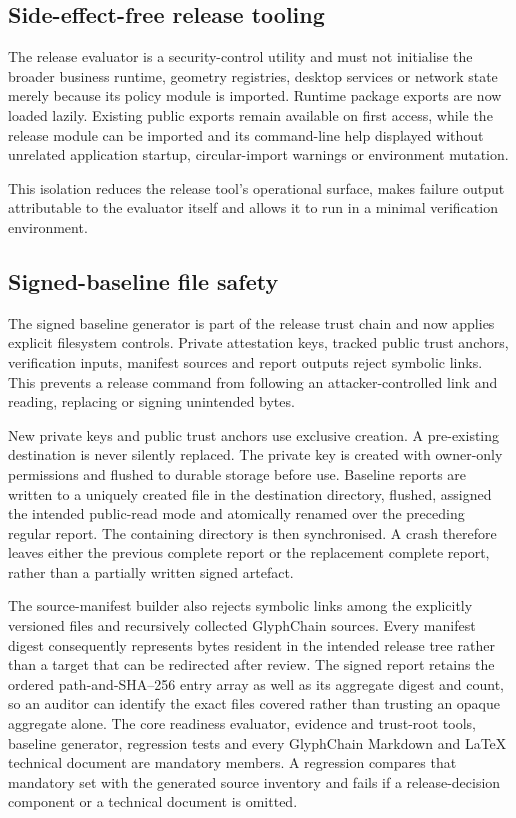 \subsection{Side-effect-free release tooling}

The release evaluator is a security-control utility and must not initialise the
broader business runtime, geometry registries, desktop services or network state
merely because its policy module is imported.  Runtime package exports are now
loaded lazily.  Existing public exports remain available on first access, while
the release module can be imported and its command-line help displayed without
unrelated application startup, circular-import warnings or environment mutation.

This isolation reduces the release tool's operational surface, makes failure
output attributable to the evaluator itself and allows it to run in a minimal
verification environment.

\subsection{Signed-baseline file safety}

The signed baseline generator is part of the release trust chain and now applies
explicit filesystem controls.  Private attestation keys, tracked public trust
anchors, verification inputs, manifest sources and report outputs reject symbolic
links.  This prevents a release command from following an attacker-controlled link
and reading, replacing or signing unintended bytes.

New private keys and public trust anchors use exclusive creation.  A pre-existing
destination is never silently replaced.  The private key is created with owner-only
permissions and flushed to durable storage before use.  Baseline reports are
written to a uniquely created file in the destination directory, flushed, assigned
the intended public-read mode and atomically renamed over the preceding regular
report.  The containing directory is then synchronised.  A crash therefore leaves
either the previous complete report or the replacement complete report, rather
than a partially written signed artefact.

The source-manifest builder also rejects symbolic links among the explicitly
versioned files and recursively collected GlyphChain sources.  Every manifest
digest consequently represents bytes resident in the intended release tree rather
than a target that can be redirected after review.  The signed report retains the
ordered path-and-SHA--256 entry array as well as its aggregate digest and count, so
an auditor can identify the exact files covered rather than trusting an opaque
aggregate alone.  The core readiness evaluator, evidence and trust-root tools,
baseline generator, regression tests and every GlyphChain Markdown and \LaTeX{}
technical document are mandatory members.  A regression compares that mandatory
set with the generated source inventory and fails if a release-decision component
or a technical document is omitted.

